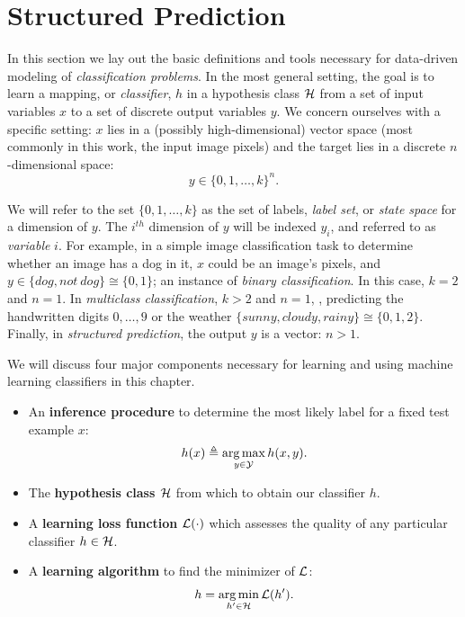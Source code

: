 \chapter{Structured Prediction}\label{sec:ml}

In this section we lay out the basic definitions and tools necessary for 
data-driven modeling of {\em classification problems}.  In the most general 
setting, the goal is to learn a mapping, or {\em classifier}, $h$ in a 
hypothesis class $\mathcal{H}$ from a set of input variables $x$ to a set of discrete 
output variables $y$.   We concern ourselves with a specific setting: $x$ lies 
in a (possibly high-dimensional) vector space (most commonly in this work, the 
input image pixels) and the target lies in a discrete $n$-dimensional space: 
$$y \in \{0,1,\ldots,k\}^n.$$  

We will refer to the set $\{0,1,\ldots,k\}$ as the set of labels, {\em label 
set}, or {\em state space} for a dimension of $y$.  The $i^{th}$ dimension of 
$y$ will be indexed $y_i$, and referred to as {\em variable} $i$.  For example, 
in a simple image classification task to determine whether an image has a dog 
in it, $x$ could be an image's pixels, and $y \in \{dog, not~dog\} \cong 
\{0,1\} $; an instance of {\em binary classification}.  In this case, $k = 2$ 
and $n = 1$.  In {\em multiclass classification}, $k>2$ and $n = 1$, \eg, 
predicting the handwritten digits $0,\dots,9$ or the weather $\{sunny, cloudy, 
rainy\} \cong \{0,1,2\}$.  Finally, in {\em structured prediction}, the output 
$y$ is a vector: $n > 1$.

We will discuss four major components necessary for learning and using machine 
learning classifiers in this chapter.

\begin{itemize}
\item An {\bf inference procedure} to determine the most likely label for a 
fixed test example $x$: \begin{equation}
h(x) \triangleq \mathop{\arg\max}_{y \in \mathcal{Y}} h(x,y).
\end{equation}
\item The {\bf hypothesis class $\mathcal{H}$} from which to obtain our classifier $h$.
\item  A {\bf learning loss function} $\mathcal{L}(\cdot)$ which assesses the quality 
of any particular classifier $h \in \mathcal{H}$.
\item A {\bf learning algorithm} to find the minimizer of $\mathcal{L}$: 
\begin{equation}
h = \mathop{\arg\min}_{h' \in \mathcal{H}} \mathcal{L}(h').
\end{equation}
\end{itemize}

